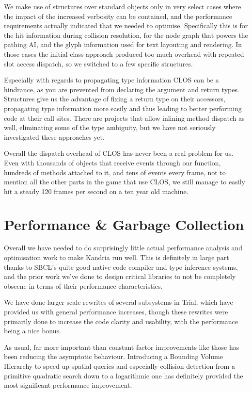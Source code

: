 \documentclass[format=sigconf]{acmart}
\begin{document}
We make use of structures over standard objects only in very select cases where the impact of the increased verbosity can be contained, and the performance requirements actually indicated that we needed to optimise. Specifically this is for the hit information during collision resolution, for the node graph that powers the pathing AI, and the glyph information used for text layouting and rendering. In those cases the initial class approach produced too much overhead with repeated slot access dispatch, so we switched to a few specific structures.

Especially with regards to propagating type information CLOS can be a hindrance, as you are prevented from declaring the argument and return types. Structures give us the advantage of fixing a return type on their accessors, propagating type information more easily and thus leading to better performing code at their call sites. There are projects that allow inlining method dispatch as well, eliminating some of the type ambiguity, but we have not seriously investigated these approaches yet.

Overall the dispatch overhead of CLOS has never been a real problem for us. Even with thousands of objects that receive events through our  function, hundreds of methods attached to it, and tens of events every frame, not to mention all the other parts in the game that use CLOS, we still manage to easily hit a steady 120 frames per second on a ten year old machine.

\section{Performance \& Garbage Collection}\label{performance}
Overall we have needed to do surprisingly little actual performance analysis and optimisation work to make Kandria run well. This is definitely in large part thanks to SBCL's quite good native code compiler and type inference systems, and the prior work we've done to design critical libraries to not be completely obscene in terms of their performance characteristics.

We have done larger scale rewrites of several subsystems in Trial, which have provided us with general performance increases, though these rewrites were primarily done to increase the code clarity and usability, with the performance being a nice bonus.

As usual, far more important than constant factor improvements like those has been reducing the asymptotic behaviour. Introducing a Bounding Volume Hierarchy to speed up spatial queries and especially collision detection from a primitive quadratic search down to a logarithmic one has definitely provided the most significant performance improvement.
\end{document}
